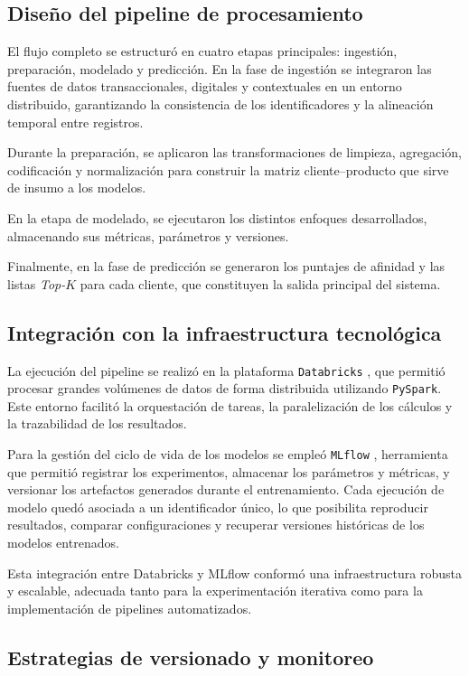 \subsection{Diseño del pipeline de procesamiento}

El flujo completo se estructuró en cuatro etapas principales: ingestión, preparación, modelado y predicción.  
En la fase de ingestión se integraron las fuentes de datos transaccionales, digitales y contextuales en un entorno distribuido, garantizando la consistencia de los identificadores y la alineación temporal entre registros. 

Durante la preparación, se aplicaron las transformaciones de limpieza, agregación, codificación y normalización para construir la matriz cliente–producto que sirve de insumo a los modelos.

En la etapa de modelado, se ejecutaron los distintos enfoques desarrollados, almacenando sus métricas, parámetros y versiones.

Finalmente, en la fase de predicción se generaron los puntajes de afinidad y las listas \textit{Top-$K$} para cada cliente, que constituyen la salida principal del sistema.

\subsection{Integración con la infraestructura tecnológica}

La ejecución del pipeline se realizó en la plataforma \texttt{Databricks} \cite{ARTICLE:Databricks}, que permitió procesar grandes volúmenes de datos de forma distribuida utilizando \texttt{PySpark}. Este entorno facilitó la orquestación de tareas, la paralelización de los cálculos y la trazabilidad de los resultados.  

Para la gestión del ciclo de vida de los modelos se empleó \texttt{MLflow} \cite{ARTICLE:MLflow2018}, herramienta que permitió registrar los experimentos, almacenar los parámetros y métricas, y versionar los artefactos generados durante el entrenamiento. Cada ejecución de modelo quedó asociada a un identificador único, lo que posibilita reproducir resultados, comparar configuraciones y recuperar versiones históricas de los modelos entrenados.  

Esta integración entre Databricks y MLflow conformó una infraestructura robusta y escalable, adecuada tanto para la experimentación iterativa como para la implementación de pipelines automatizados.

\subsection{Estrategias de versionado y monitoreo}

